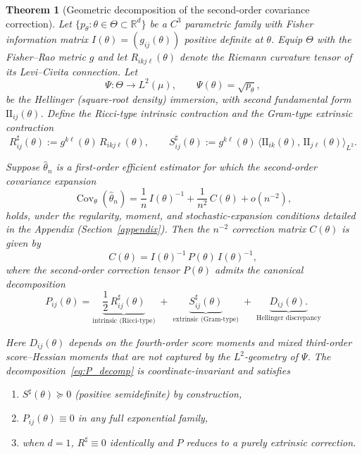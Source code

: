 \documentclass[11pt,letterpaper]{amsart}
\DeclareMathOperator{\Cov}{Cov}
\numberwithin{equation}{section}
\theoremstyle{plain}
\newtheorem{theorem}{Theorem}[section]
\theoremstyle{definition}
\theoremstyle{remark}
\begin{document}
\begin{theorem}[Geometric decomposition of the second-order covariance correction]
\label{thm:main}
Let $\{p_\theta : \theta \in \Theta \subset \mathbb{R}^d\}$ be a $C^3$ parametric family with Fisher information matrix $I(\theta) = (g_{ij}(\theta))$ positive definite at $\theta$. Equip $\Theta$ with the Fisher--Rao metric $g$ and let $R_{ikj\ell}(\theta)$ denote the Riemann curvature tensor of its Levi--Civita connection. Let
\[
\Psi : \Theta \to L^2(\mu), \qquad \Psi(\theta) = \sqrt{p_\theta},
\]
be the Hellinger (square-root density) immersion, with second fundamental form $\mathrm{II}_{ij}(\theta)$. Define the Ricci-type intrinsic contraction and the Gram-type extrinsic contraction
\[
R^\sharp_{ij}(\theta) := g^{k\ell}(\theta)\, R_{ikj\ell}(\theta),
\qquad
S^\sharp_{ij}(\theta) := g^{k\ell}(\theta)\, \langle \mathrm{II}_{ik}(\theta),\, \mathrm{II}_{j\ell}(\theta) \rangle_{L^2}.
\]

Suppose $\hat\theta_n$ is a first-order efficient estimator for which the second-order covariance expansion
\[
\Cov_\theta(\hat\theta_n)
=
\frac{1}{n}\, I(\theta)^{-1}
+
\frac{1}{n^2}\, C(\theta)
+ o(n^{-2}),
\]
holds, under the regularity, moment, and stochastic-expansion conditions detailed in the Appendix (Section~\ref{appendix}). Then the $n^{-2}$ correction matrix $C(\theta)$ is given by
\[
C(\theta) = I(\theta)^{-1}\, P(\theta)\, I(\theta)^{-1},
\]
where the \emph{second-order correction tensor} $P(\theta)$ admits the canonical decomposition
\begin{equation}\label{eq:P_decomp}
P_{ij}(\theta)
=
\underbrace{\frac{1}{2}\, R^\sharp_{ij}(\theta)}_{\text{intrinsic (Ricci-type)}}
\;+\;
\underbrace{S^\sharp_{ij}(\theta)}_{\text{extrinsic (Gram-type)}}
\;+\;
\underbrace{D_{ij}(\theta).}_{\text{Hellinger discrepancy}}
\end{equation}

Here $D_{ij}(\theta)$ depends on the fourth-order score moments and mixed third-order score--Hessian moments that are not captured by the $L^2$-geometry of $\Psi$. The decomposition~\eqref{eq:P_decomp} is \emph{coordinate-invariant} and satisfies
\begin{enumerate}
\item $S^\sharp(\theta) \succeq 0$ \emph{(positive semidefinite)} by construction,
\item $P_{ij}(\theta) \equiv 0$ in any full exponential family,
\item when $d=1$, $R^\sharp \equiv 0$ identically and $P$ reduces to a purely extrinsic correction.
\end{enumerate}
\end{theorem}
\end{document}
